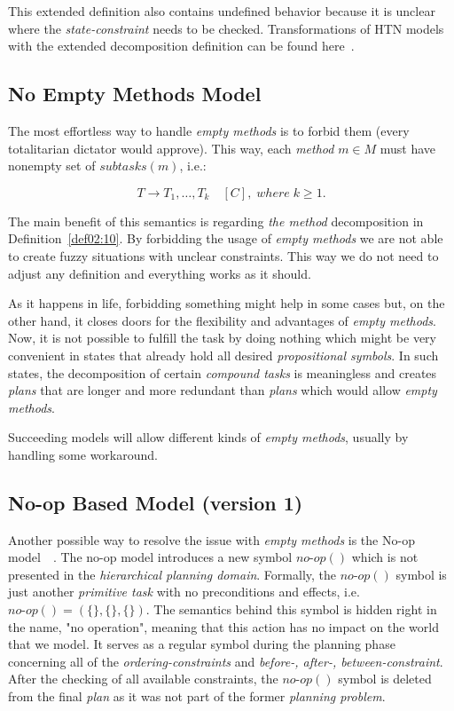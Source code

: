 This extended definition also contains undefined behavior because it is unclear where the \emph{state-constraint} needs to be checked. Transformations of HTN models with the extended decomposition definition can be found here~\cite{ondrckova2024empty}.

\subsection{No Empty Methods Model}\label{sub03:311}

\medskip\noindent
The most effortless way to handle \emph{empty methods} is to forbid them (every totalitarian dictator would approve). This way, each \emph{method} $m \in M$ must have nonempty set of $subtasks(m)$, i.e.:

\[
    T \rightarrow T_1,\dots,T_k \quad [C], \; where \; k \geq 1.
\]

\noindent
The main benefit of this semantics is regarding \emph{the method} decomposition in Definition~\ref{def02:10}. By forbidding the usage of \emph{empty methods} we are not able to create fuzzy situations with unclear constraints. This way we do not need to adjust any definition and everything works as it should.

\medskip\noindent
As it happens in life, forbidding something might help in some cases but, on the other hand, it closes doors for the flexibility and advantages of \emph{empty methods}. Now, it is not possible to fulfill the task by doing nothing which might be very convenient in states that already hold all desired \emph{propositional symbols}. In such states, the decomposition of certain \emph{compound tasks} is meaningless and creates \emph{plans} that are longer and more redundant than \emph{plans} which would allow \emph{empty methods}.

\medskip\noindent
Succeeding models will allow different kinds of \emph{empty methods}, usually by handling some workaround.

\subsection{No-op Based Model (version 1)}

\medskip\noindent
Another possible way to resolve the issue with \emph{empty methods} is the No-op model~\cite{ondrckova2023semantics}~\cite{ondrckova2024empty}. The no-op model introduces a new symbol $no\text{-}op()$ which is not presented in the \emph{hierarchical planning domain}. Formally, the $no\text{-}op()$ symbol is just another \emph{primitive task} with no preconditions and effects, i.e. $no\text{-}op() = (\{\}, \{\}, \{\})$. The semantics behind this symbol is hidden right in the name, "no operation", meaning that this action has no impact on the world that we model. It serves as a regular symbol during the planning phase concerning all of the \emph{ordering-constraints} and \emph{before-, after-, between-constraint}. After the checking of all available constraints, the $no\text{-}op()$ symbol is deleted from the final \emph{plan} as it was not part of the former \emph{planning problem}.

